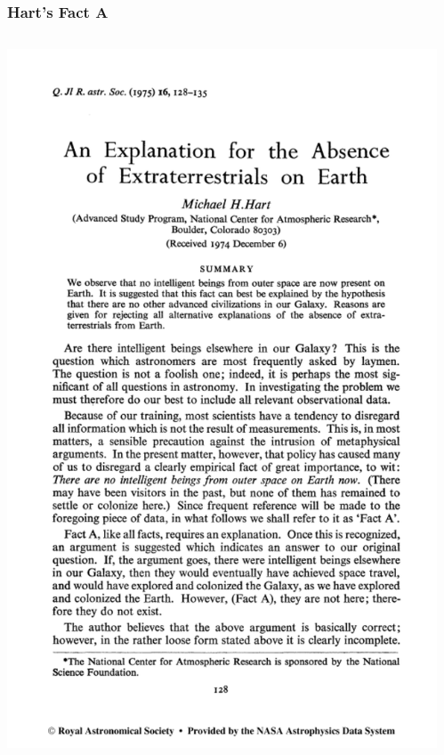 \begin{frame}
\frametitle{Hart's Fact A}

\begin{columns}
\includegraphics[scale=0.28]{hartpaper}
\begin{itemize}


\end{itemize}
\end{columns}
\end{frame}
